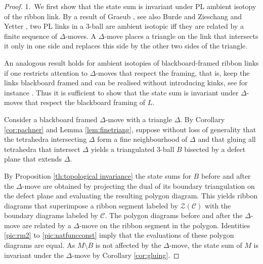 \documentclass[1.5pt, a4paper]{article}
\newcommand{\mac}{\mathcal C}
\begin{document}
\begin{proof} 1.~We first show that the state sum is invariant under PL ambient isotopy of the ribbon link. By a result of Graeub \cite{Gr}, see also Burde and Zieschang \cite[Prop.~1.10]{BZ}
and Yetter \cite[Sec.~2.2]{Y}, two PL links in a 3-ball are ambient isotopic iff they are related by  a finite sequence of $\Delta$-moves. 
A $\Delta$-move 
places a triangle on the link that intersects it only  in one side and replaces this side by the other two sides of the triangle. 
\begin{center}
\end{center}


An analogous result holds for ambient isotopies of blackboard-framed  ribbon links if one restricts attention to $\Delta$-moves that respect the framing, that is, keep the links blackboard framed  and can be realised without introducing kinks, see for instance \cite[Sec.~2.2]{Y}. Thus it is sufficient to show that the state sum is invariant under $\Delta$-moves that respect the blackboard framing of $L$. 



Consider a blackboard framed $\Delta$-move with a triangle $\Delta$.  By Corollary \ref{cor:pachner} and Lemma \ref{lem:finetriang}, suppose without loss of generality  that the tetrahedra intersecting $\Delta$ form a fine neighbourhood of $\Delta$ and that  gluing all tetrahedra that intersect $\Delta$ yields a triangulated 3-ball $B$ bisected by a defect plane that extends $\Delta$.

By Proposition \ref{th:topological invariance} the state sums for $B$ before and after the $\Delta$-move are obtained by projecting the dual of its boundary triangulation on the defect plane and evaluating the resulting polygon diagram. This yields ribbon diagrams that superimpose a ribbon segment labeled by $\mathcal Z(\mac)$ with the boundary diagrams labeled by $\mac$. The polygon diagrams before and after the $\Delta$-move are related by a $\Delta$-move on the ribbon segment in the polygon. Identities \eqref{pic:rm2} to \eqref{pic:natfuncconst}  imply that the evaluations of these polygon diagrams are equal.  As $M\setminus B$ is not affected by the $\Delta$-move,  the state sum of $M$ is invariant under the $\Delta$-move by Corollary \ref{cor:gluing}. 


\end{proof}
\end{document}
